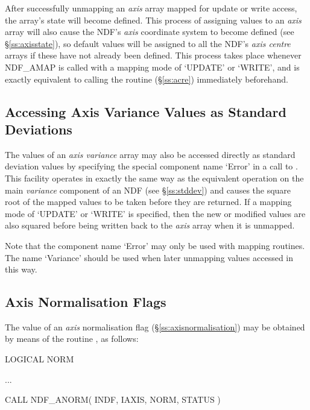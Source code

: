 \documentclass[twoside,11pt,nolof]{starlink}
\providecommand{\st}[1]{{\emph{#1}}}
\begin{document}
After successfully unmapping an \st{axis\/} array mapped for update or
write access, the array's state will become defined.
This process of assigning values to an \st{axis\/} array will also cause
the NDF's \st{axis\/} coordinate system to become defined (see
\S\ref{ss:axisstate}), so default values will be assigned to all the NDF's
\st{axis centre\/} arrays if these have not already been defined.
This process takes place whenever NDF\_AMAP is called with a mapping mode of
`UPDATE' or `WRITE', and is exactly equivalent to calling the routine
 (\S\ref{ss:acre}) immediately beforehand.

\subsection{\label{ss:axisstddev}Accessing Axis Variance Values as Standard Deviations}

The values of an \st{axis variance\/} array may also be accessed directly
as standard deviation values by specifying the special component name
`Error' in a call to .
This facility operates in exactly the same way as the equivalent operation
on the main \st{variance\/} component of an NDF (see \S\ref{ss:stddev}) and
causes the square root of the mapped values to be taken before they are
returned.
If a mapping mode of `UPDATE' or `WRITE' is specified, then the new or
modified values are also squared before being written back to the
\st{axis\/} array when it is unmapped.

Note that the component name `Error' may only be used with mapping routines.
The name `Variance' should be used when later unmapping values accessed in
this way.

\subsection{Axis Normalisation Flags}

The value of an \st{axis\/} normalisation flag
(\S\ref{ss:axisnormalisation}) may be obtained by means of the routine
, as follows:

\small
\begin{terminalv}
      LOGICAL NORM

      ...

      CALL NDF_ANORM( INDF, IAXIS, NORM, STATUS )
\end{terminalv}
\normalsize
\end{document}
